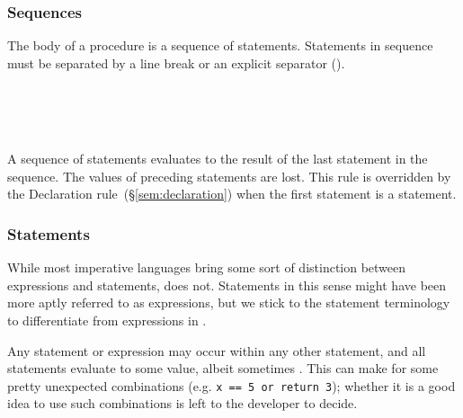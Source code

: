 \begin{prooftree}
\end{prooftree}

\subsubsection{Sequences}

The body of a procedure is a sequence of statements. Statements in sequence
must be separated by a line break or an explicit separator (\op{,}).

\begin{bnf*}
     \\
     \\
     \\
\end{bnf*}

A sequence of statements evaluates to the result of the last statement
in the sequence. The values of preceding statements are lost. This rule
is overridden by the Declaration rule~(\S\ref{sem:declaration}) when
the first statement is a  statement.

\begin{prooftree}
\end{prooftree}

\subsubsection{Statements}

While most imperative languages bring some sort of distinction between
expressions and statements, \Prose{} does not. Statements in this
sense might have been more aptly referred to as expressions, but we
stick to the statement terminology to differentiate from expressions
in \Poetry{}.

Any statement or expression may occur within any other statement, and
all statements evaluate to some value, albeit sometimes .
This can make for some pretty unexpected combinations
(e.g. \texttt{x == 5 or return 3}); whether it is a good idea to use
such combinations is left to the developer to decide.

